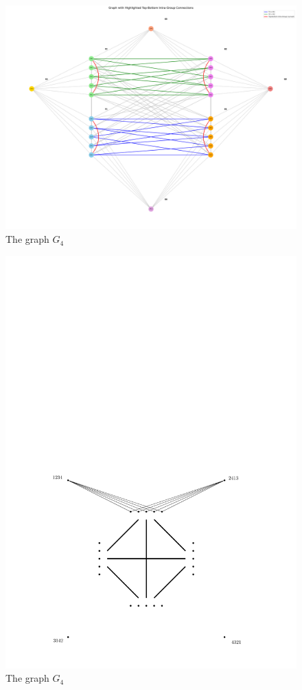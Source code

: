 \documentclass[runningheads]{llncs}
\begin{document}
\begin{figure}[ht]
  \centering
  \includegraphics[scale=0.1]{G4.png}
  \caption{The graph $G_{4}$}
  \label{G4}
\end{figure}

\begin{figure}[ht]
  \centering
  \includegraphics[scale=0.7]{G4.pdf}
  \caption{The graph $G_{4}$}
  \label{G4}
\end{figure}
\end{document}
